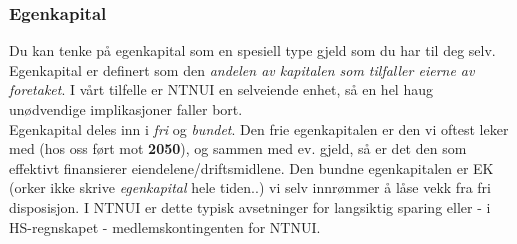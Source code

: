 \hypertarget{ff-egenkap}{}

\subsubsection*{Egenkapital}
Du kan tenke på egenkapital som en spesiell type gjeld som du har til deg selv.
Egenkapital er definert som den \emph{andelen av kapitalen som tilfaller eierne av foretaket}. I vårt tilfelle er NTNUI en selveiende enhet, så en hel haug unødvendige implikasjoner faller bort.\\
Egenkapital deles inn i \emph{fri} og \emph{bundet}. Den frie egenkapitalen er den vi oftest leker med (hos oss ført mot {\bfseries 2050}), og sammen med ev. gjeld, så er det den som effektivt finansierer eiendelene/driftsmidlene. Den bundne egenkapitalen er EK (orker ikke skrive \emph{egenkapital} hele tiden..) vi selv innrømmer å låse vekk fra fri disposisjon. I NTNUI er dette typisk avsetninger for langsiktig sparing eller - i HS-regnskapet - medlemskontingenten for NTNUI.
